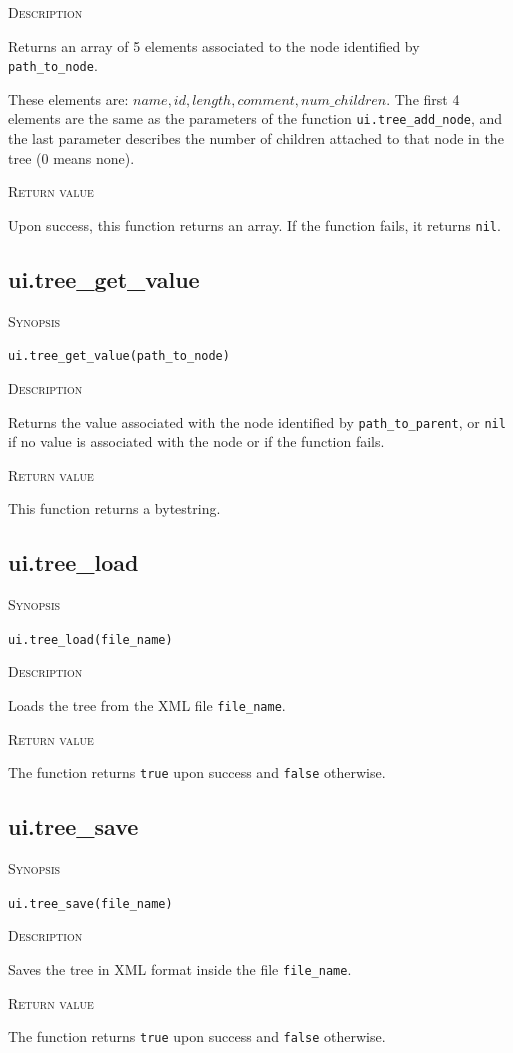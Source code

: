 \documentclass[11pt]{report}
\newcommand{\mansection}[1]{\vspace{0.5em}\par\noindent\textsc{#1}\vspace{0.5em}\par}
\newcommand{\syn}[1]{\texttt{#1}}
\begin{document}
\mansection{Description}
  Returns an array of 5 elements associated to the node identified by 
  \syn{path\_to\_node}.
 
  These elements are: ${name, id, length, comment, num\_children}$. 
  The first 4 elements are the same as the parameters of the function 
  \syn{ui.tree\_add\_node}, and the last parameter describes the number of 
  children attached to that node in the tree (0 means none).

\mansection{Return value}
  Upon success, this function returns an array.
  If the function fails, it returns \syn{nil}.


\subsection{ui.tree\_get\_value}

\mansection{Synopsis}
\syn{ui.tree\_get\_value(path\_to\_node)}

\mansection{Description}
  Returns the value associated with the node identified by \syn{path\_to\_parent}, 
  or \syn{nil} if no value is associated with the node or if the function fails.

\mansection{Return value}
  This function returns a bytestring.
 

\subsection{ui.tree\_load}

\mansection{Synopsis}
\syn{ui.tree\_load(file\_name)}

\mansection{Description}
  Loads the tree from the XML file \syn{file\_name}.

\mansection{Return value}
  The function returns \syn{true} upon success and \syn{false} otherwise.


\subsection{ui.tree\_save}

\mansection{Synopsis}
\syn{ui.tree\_save(file\_name)}

\mansection{Description}
  Saves the tree in XML format inside the file \syn{file\_name}.

\mansection{Return value}
  The function returns \syn{true} upon success and \syn{false} otherwise.
\end{document}
